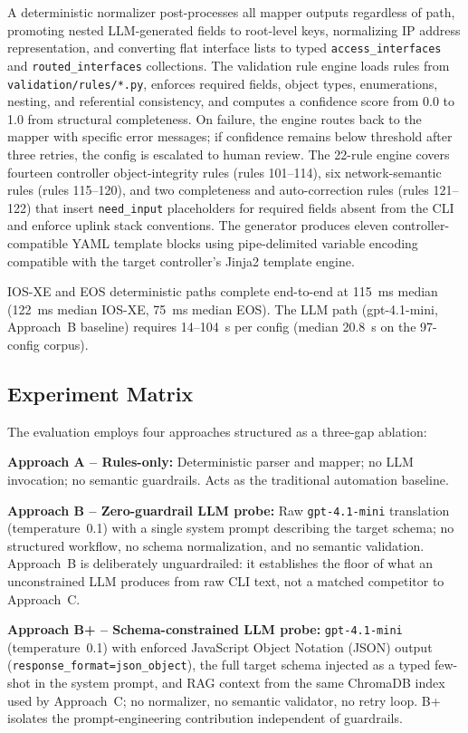 \documentclass[conference]{IEEEtran}
\begin{document}
A deterministic normalizer post-processes all mapper outputs regardless of path, promoting nested LLM-generated fields to root-level keys, normalizing IP address representation, and converting flat interface lists to typed \texttt{access\_interfaces} and \texttt{routed\_interfaces} collections. The validation rule engine loads rules from \texttt{validation/rules/*.py}, enforces required fields, object types, enumerations, nesting, and referential consistency, and computes a confidence score from 0.0 to 1.0 from structural completeness. On failure, the engine routes back to the mapper with specific error messages; if confidence remains below threshold after three retries, the config is escalated to human review. The 22-rule engine covers fourteen controller object-integrity rules (rules 101--114), six network-semantic rules (rules 115--120), and two completeness and auto-correction rules (rules 121--122) that insert \texttt{need\_input} placeholders for required fields absent from the CLI and enforce uplink stack conventions. The generator produces eleven controller-compatible YAML template blocks using pipe-delimited variable encoding compatible with the target controller's Jinja2 template engine.

IOS-XE and EOS deterministic paths complete end-to-end at 115~ms median (122~ms median IOS-XE, 75~ms median EOS). The LLM path (gpt-4.1-mini, Approach~B baseline) requires 14--104~s per config (median 20.8~s on the 97-config corpus).

\subsection{Experiment Matrix}

The evaluation employs four approaches structured as a three-gap ablation:

\textbf{Approach A -- Rules-only:} Deterministic parser and mapper; no LLM invocation; no semantic guardrails. Acts as the traditional automation baseline.

\textbf{Approach B -- Zero-guardrail LLM probe:} Raw \texttt{gpt-4.1-mini} translation (temperature~0.1) with a single system prompt describing the target schema; no structured workflow, no schema normalization, and no semantic validation. Approach~B is deliberately unguardrailed: it establishes the floor of what an unconstrained LLM produces from raw CLI text, not a matched competitor to Approach~C.

\textbf{Approach B+ -- Schema-constrained LLM probe:} \texttt{gpt-4.1-mini} (temperature~0.1) with enforced JavaScript Object Notation (JSON) output (\texttt{response\_format=json\_object}), the full target schema injected as a typed few-shot in the system prompt, and RAG context from the same ChromaDB index used by Approach~C; no normalizer, no semantic validator, no retry loop. B+ isolates the prompt-engineering contribution independent of guardrails.
\end{document}
